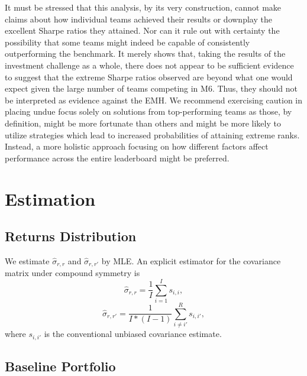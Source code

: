 \documentclass[3p,times,twocolumn]{elsarticle}
\begin{document}
It must be stressed that this analysis, by its very construction, cannot make claims about how individual teams achieved their results or downplay the excellent Sharpe ratios they attained.
Nor can it rule out with certainty the possibility that some teams might indeed be capable of consistently outperforming the benchmark.
It merely shows that, taking the results of the investment challenge as a whole, there does not appear to be sufficient evidence to suggest that the extreme Sharpe ratios observed are beyond what one would expect given the large number of teams competing in M6.
Thus, they should not be interpreted as evidence against the EMH.
We recommend exercising caution in placing undue focus solely on solutions from top-performing teams as those, by definition, might be more fortunate than others and might be more likely to utilize strategies which lead to increased probabilities of attaining extreme ranks.
Instead, a more holistic approach focusing on how different factors affect performance across the entire leaderboard might be preferred.


% 

\appendix

\section{Estimation}

\subsection{Returns Distribution}\label{appendix:returns_distribution}

We estimate $\widehat{\sigma}_{r,r}$ and $\widehat{\sigma}_{r,r'}$ by MLE.
An explicit estimator for the covariance matrix under compound symmetry \citep[see][p. 95]{seberMultivariateObservations1984} is
\begin{equation}
    \widehat{\sigma}_{r,r}=\dfrac{1}{I}\sum_{i=1}^{I}s_{i,i},
\end{equation}
\begin{equation}
    \widehat{\sigma}_{r,r'}=\dfrac{1}{I*(I-1)}\sum_{i\neq i'}^{R}s_{i,i'},
\end{equation}
where $s_{i,i'}$ is the conventional unbiased covariance estimate.

\subsection{Baseline Portfolio}\label{appendix:baseline_portfolio}
\end{document}
